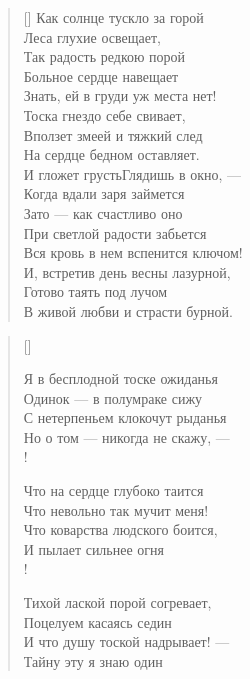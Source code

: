 \newpage
\vspace*{0cm}

\begin{verse}[\versewidth]
Как солнце тускло за горой\\
Леса глухие освещает,\\
Так радость редкою порой\\
Больное сердце навещает\ldotst\\
Знать, ей в груди уж места нет!\\
Тоска гнездо себе свивает,\\
Вползет змеей и тяжкий след\\
На сердце бедном оставляет.\\
И гложет грусть\ldotst Глядишь в окно, ---\\
Когда вдали заря займется\ldotsq\\
Зато --- как счастливо оно\\
При светлой радости забьется\ldotse\\
Вся кровь в нем вспенится ключом!\\
И, встретив день весны лазурной,\\
Готово таять под лучом\\
В живой любви и страсти бурной.
\end{verse}


\newpage
\vspace*{0cm}

\settowidth{\versewidth}{Я в бесплодной тоске ожиданья}
\begin{verse}[\versewidth]
\begin{altverse}
Я в бесплодной тоске ожиданья\\
     Одинок --- в полумраке сижу\ldotst\\
С нетерпеньем клокочут рыданья\ldotst\\
     Но о том --- никогда не скажу, ---\\!

Что на сердце глубоко таится\ldotst\\
     Что невольно так мучит меня!\\
Что коварства людского боится,\\
     И пылает сильнее огня\ldotst\\!

Тихой лаской порой согревает,\\
     Поцелуем касаясь седин\ldotst\\
И что душу тоской надрывает! ---\\
	 Тайну эту я знаю один\ldotst
\end{altverse}
\end{verse}

